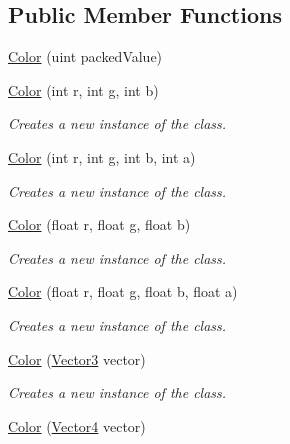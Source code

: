 \subsection*{Public Member Functions}
\begin{DoxyCompactItemize}
\item 
\hyperlink{structMicrosoft_1_1Xna_1_1Framework_1_1Color_ab9b35f296de77e93a8f42750c70db93a}{Color} (uint packed\+Value)
\item 
\hyperlink{structMicrosoft_1_1Xna_1_1Framework_1_1Color_a98402a95bcb5cc6ee933cf3213971ad2}{Color} (int r, int g, int b)
\begin{DoxyCompactList}\small\item\em Creates a new instance of the class.\end{DoxyCompactList}\item 
\hyperlink{structMicrosoft_1_1Xna_1_1Framework_1_1Color_a08859a7e176d0a35ce672b190a18da00}{Color} (int r, int g, int b, int a)
\begin{DoxyCompactList}\small\item\em Creates a new instance of the class.\end{DoxyCompactList}\item 
\hyperlink{structMicrosoft_1_1Xna_1_1Framework_1_1Color_a83b0cedfb6ce76cc35b79da9fdcbefe1}{Color} (float r, float g, float b)
\begin{DoxyCompactList}\small\item\em Creates a new instance of the class.\end{DoxyCompactList}\item 
\hyperlink{structMicrosoft_1_1Xna_1_1Framework_1_1Color_a3a16ce43c0187e22831a1b768002fd73}{Color} (float r, float g, float b, float a)
\begin{DoxyCompactList}\small\item\em Creates a new instance of the class.\end{DoxyCompactList}\item 
\hyperlink{structMicrosoft_1_1Xna_1_1Framework_1_1Color_a4a4f4799d324217ae264a0470dd6dda8}{Color} (\hyperlink{structMicrosoft_1_1Xna_1_1Framework_1_1Vector3}{Vector3} vector)
\begin{DoxyCompactList}\small\item\em Creates a new instance of the class.\end{DoxyCompactList}\item 
\hyperlink{structMicrosoft_1_1Xna_1_1Framework_1_1Color_ac545262a3d7de77a99a7c158fa356e91}{Color} (\hyperlink{structMicrosoft_1_1Xna_1_1Framework_1_1Vector4}{Vector4} vector)

\end{DoxyCompactItemize}

